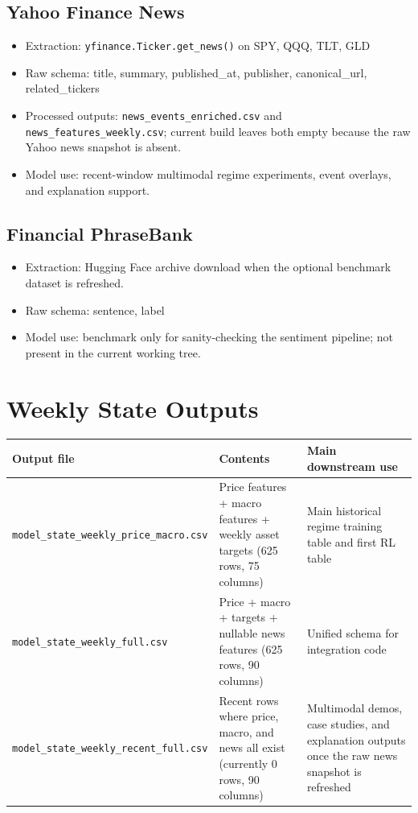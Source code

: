 \documentclass[11pt,a4paper]{article}
\begin{document}
            \subsection{Yahoo Finance News}
            \begin{itemize}[leftmargin=1.4em]
              \item Extraction: \texttt{yfinance.Ticker.get\_news()} on SPY, QQQ, TLT, GLD
              \item Raw schema: title, summary, published\_at, publisher, canonical\_url, related\_tickers
              \item Processed outputs: \texttt{news\_events\_enriched.csv} and \texttt{news\_features\_weekly.csv}; current build leaves both empty because the raw Yahoo news snapshot is absent.
              \item Model use: recent-window multimodal regime experiments, event overlays, and explanation support.
            \end{itemize}

            \subsection{Financial PhraseBank}
            \begin{itemize}[leftmargin=1.4em]
              \item Extraction: Hugging Face archive download when the optional benchmark dataset is refreshed.
              \item Raw schema: sentence, label
              \item Model use: benchmark only for sanity-checking the sentiment pipeline; not present in the current working tree.
            \end{itemize}

            \section{Weekly State Outputs}

            \begin{tabularx}{\textwidth}{@{}p{}YY@{}}
            \toprule
            \textbf{Output file} & \textbf{Contents} & \textbf{Main downstream use} \\
            \midrule
            \texttt{model\_state\_weekly\_price\_macro.csv} & Price features + macro features + weekly asset targets (625 rows, 75 columns) & Main historical regime training table and first RL table \\
            \texttt{model\_state\_weekly\_full.csv} & Price + macro + targets + nullable news features (625 rows, 90 columns) & Unified schema for integration code \\
            \texttt{model\_state\_weekly\_recent\_full.csv} & Recent rows where price, macro, and news all exist (currently 0 rows, 90 columns) & Multimodal demos, case studies, and explanation outputs once the raw news snapshot is refreshed \\
            \bottomrule
            \end{tabularx}
\end{document}

